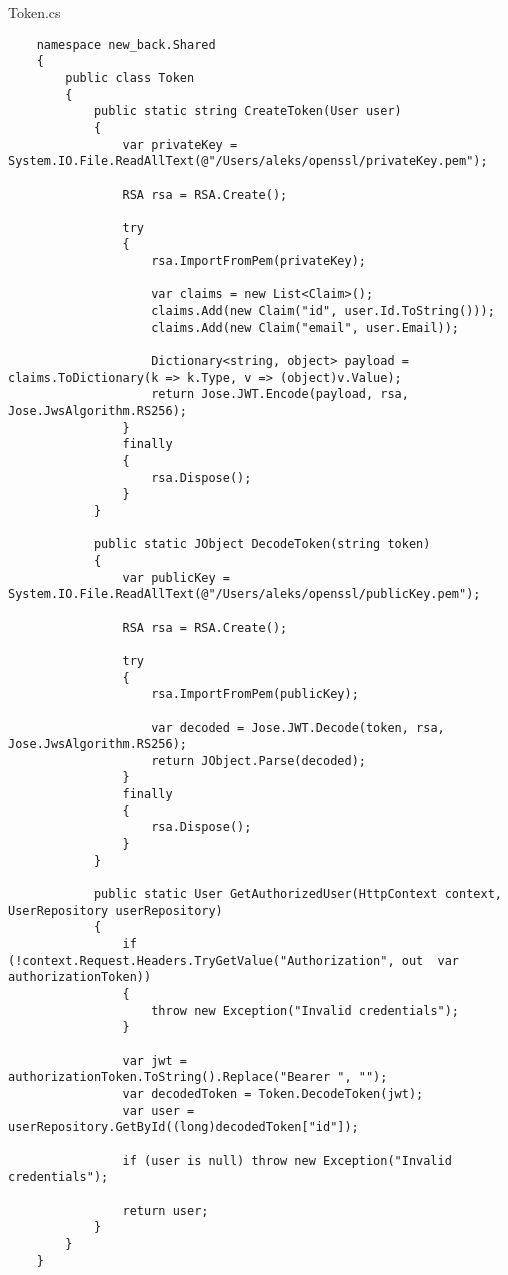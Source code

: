 Token.cs
\lstset{style=sharpc}
\begin{lstlisting}
    namespace new_back.Shared
    {
        public class Token
        {
            public static string CreateToken(User user)
            {
                var privateKey = System.IO.File.ReadAllText(@"/Users/aleks/openssl/privateKey.pem");
                
                RSA rsa = RSA.Create();
    
                try
                {
                    rsa.ImportFromPem(privateKey);
    
                    var claims = new List<Claim>();
                    claims.Add(new Claim("id", user.Id.ToString()));
                    claims.Add(new Claim("email", user.Email));
    
                    Dictionary<string, object> payload = claims.ToDictionary(k => k.Type, v => (object)v.Value);
                    return Jose.JWT.Encode(payload, rsa, Jose.JwsAlgorithm.RS256);
                }
                finally
                {
                    rsa.Dispose();
                }
            }
            
            public static JObject DecodeToken(string token)
            {
                var publicKey = System.IO.File.ReadAllText(@"/Users/aleks/openssl/publicKey.pem");
                
                RSA rsa = RSA.Create();
    
                try
                {
                    rsa.ImportFromPem(publicKey);
    
                    var decoded = Jose.JWT.Decode(token, rsa, Jose.JwsAlgorithm.RS256);
                    return JObject.Parse(decoded);  
                }
                finally
                {
                    rsa.Dispose();
                }
            }
    
            public static User GetAuthorizedUser(HttpContext context, UserRepository userRepository)
            {
                if (!context.Request.Headers.TryGetValue("Authorization", out  var authorizationToken))
                {
                    throw new Exception("Invalid credentials");
                }
          
                var jwt = authorizationToken.ToString().Replace("Bearer ", "");
                var decodedToken = Token.DecodeToken(jwt);
                var user = userRepository.GetById((long)decodedToken["id"]);
    
                if (user is null) throw new Exception("Invalid credentials");
            
                return user;
            }
        }
    }
\end{lstlisting}

